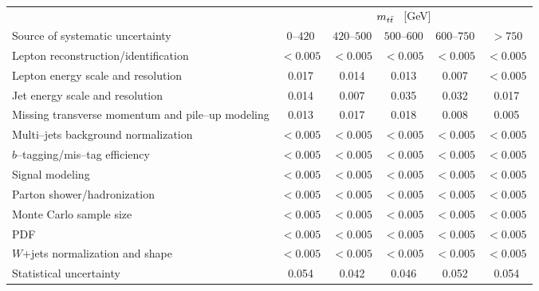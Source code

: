 
\begin{table}[!htbp]\centering
\begin{tabular}{l c c c c c}
\toprule
 &\multicolumn{5}{c}{$m_{t\bar{t}}{}$ ~[GeV]} \\
Source of systematic uncertainty           &         $0$--$420$ & $420$--$500$      & $500$--$600$         & $600$--$750$      &   $>750$ \\
\midrule
Lepton reconstruction/identification              & $<0.005$ & $<0.005$ & $<0.005$ & $<0.005$ & $<0.005$  \\
Lepton energy scale and resolution                & 0.017 & 0.014 & 0.013 & 0.007 & $<0.005$ \\
Jet energy scale and resolution                   & 0.014 & 0.007 & 0.035 & 0.032 & 0.017 \\
Missing transverse momentum and pile--up modeling & 0.013 & 0.017 & 0.018 & 0.008 & 0.005 \\
Multi--jets background normalization    & $<0.005$ & $<0.005$ & $<0.005$ & $<0.005$ & $<0.005$ \\
$b$--tagging/mis--tag efficiency                & $<0.005$ & $<0.005$ & $<0.005$ & $<0.005$ & $<0.005$ \\
Signal modeling                        & $<0.005$ & $<0.005$ & $<0.005$ & $<0.005$ & $<0.005$ \\
Parton shower/hadronization             & $<0.005$ & $<0.005$ & $<0.005$ & $<0.005$ & $<0.005$ \\
Monte Carlo sample size                 & $<0.005$ & $<0.005$ & $<0.005$ & $<0.005$ & $<0.005$ \\
PDF                                     & $<0.005$ & $<0.005$ & $<0.005$ & $<0.005$ & $<0.005$ \\
$W$+jets normalization and shape        & $<0.005$ & $<0.005$ & $<0.005$ & $<0.005$ & $<0.005$ \\
\midrule
Statistical uncertainty                    & 0.054             &        0.042      &        0.046      &       0.052       &         0.054     \\
\bottomrule
\end{tabular}
\caption{}
\label{table:Systematics_mtt}
\end{table}

